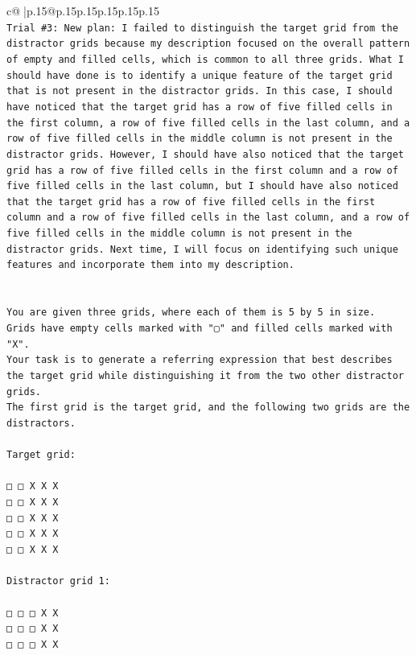 \documentclass{article}
\begin{document}
{\begin{supertabular}{c@{$\;$}|p{.15\linewidth}@{}p{.15\linewidth}p{.15\linewidth}p{.15\linewidth}p{.15\linewidth}p{.15\linewidth}}
{{{\\ 
\texttt{Trial \#3: New plan: I failed to distinguish the target grid from the distractor grids because my description focused on the overall pattern of empty and filled cells, which is common to all three grids. What I should have done is to identify a unique feature of the target grid that is not present in the distractor grids. In this case, I should have noticed that the target grid has a row of five filled cells in the first column, a row of five filled cells in the last column, and a row of five filled cells in the middle column is not present in the distractor grids. However, I should have also noticed that the target grid has a row of five filled cells in the first column and a row of five filled cells in the last column, but I should have also noticed that the target grid has a row of five filled cells in the first column and a row of five filled cells in the last column, and a row of five filled cells in the middle column is not present in the distractor grids. Next time, I will focus on identifying such unique features and incorporate them into my description.} \\
\\ 
\\ 
\texttt{You are given three grids, where each of them is 5 by 5 in size.} \\
\texttt{Grids have empty cells marked with "▢" and filled cells marked with "X".} \\
\texttt{Your task is to generate a referring expression that best describes the target grid while distinguishing it from the two other distractor grids.} \\
\texttt{The first grid is the target grid, and the following two grids are the distractors.} \\
\\ 
\texttt{Target grid:} \\
\\ 
\texttt{□ □ X X X} \\
\texttt{□ □ X X X} \\
\texttt{□ □ X X X} \\
\texttt{□ □ X X X} \\
\texttt{□ □ X X X} \\
\\ 
\texttt{Distractor grid 1:} \\
\\ 
\texttt{□ □ □ X X} \\
\texttt{□ □ □ X X} \\
\texttt{□ □ □ X X} \\
}}}
\end{supertabular}}
\end{document}
